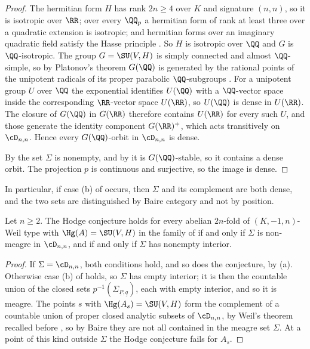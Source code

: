 \begin{proof}
The hermitian form $H$ has rank $2n\ge4$ over $K$ and signature $(n,n)$, so it
is isotropic over $\RR$; over every $\QQ_{p}$ a hermitian form of rank at
least three over a quadratic extension is isotropic; and hermitian forms over
an imaginary quadratic field satisfy the Hasse principle
\cite[Ch.~10, \S 6]{Sch85}. So $H$ is isotropic over $\QQ$ and $G$ is
$\QQ$-isotropic. The group $G=\SU(V,H)$ is simply connected and almost
$\QQ$-simple, so by Platonov's theorem $G(\QQ)$ is generated by the rational
points of the unipotent radicals of its proper parabolic $\QQ$-subgroups
\cite[Thm.~7.6 and \S 7.2]{PR94}. For a unipotent group $U$ over $\QQ$ the
exponential identifies $U(\QQ)$ with a $\QQ$-vector space inside the
corresponding $\RR$-vector space $U(\RR)$, so $U(\QQ)$ is dense in $U(\RR)$.
The closure of $G(\QQ)$ in $G(\RR)$ therefore contains $U(\RR)$ for every such
$U$, and those generate the identity component $G(\RR)^{+}$, which acts
transitively on $\cD_{n,n}$. Hence every $G(\QQ)$-orbit in $\cD_{n,n}$ is
dense.

By  the set $\Sigma$ is nonempty, and by
 it is $G(\QQ)$-stable, so it contains a dense orbit.
The projection $p$ is continuous and surjective, so the image is dense.
\end{proof}

In particular, if case (b) of  occurs, then $\Sigma$
and its complement are both dense, and the two sets are distinguished by
Baire category and not by position.

\begin{corollary}\label{cor:meagre}
Let $n\ge2$. The Hodge conjecture holds for every abelian $2n$-fold of
$(K,-1,n)$-Weil type with $\Hg(A)=\SU(V,H)$ in the family of
 if and only if $\Sigma$ is non-meagre in $\cD_{n,n}$, and
if and only if $\Sigma$ has nonempty interior.
\end{corollary}

\begin{proof}
If $\Sigma=\cD_{n,n}$, both conditions hold, and so does the conjecture, by
(a). Otherwise case (b) of  holds,
so $\Sigma$ has empty interior; it is then the countable union of the closed
sets $p^{-1}(\Sigma_{\underline{P},\underline{q}})$, each with empty interior,
and so it is meagre. The points $s$ with $\Hg(A_{s})=\SU(V,H)$ form the
complement of a countable union of proper closed analytic subsets of $\cD_{n,n}$, by
Weil's theorem \cite{Weil77} recalled before , so by Baire
they are not all contained in the meagre set $\Sigma$. At a point of this
kind outside $\Sigma$ the Hodge conjecture fails for $A_{s}$.
\end{proof}

